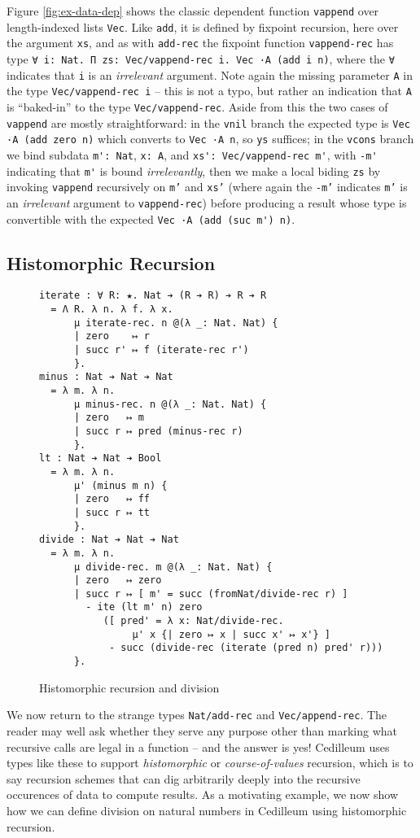 \documentclass{article}
\begin{document}
Figure \ref{fig:ex-data-dep} shows the classic dependent function
\texttt{vappend} over length-indexed lists \texttt{Vec}. Like \texttt{add}, it is
defined by fixpoint recursion, here over the argument \texttt{xs}, and as with
\texttt{add-rec} the fixpoint function \texttt{vappend-rec} has type
\verb;∀ i: Nat. Π zs: Vec/vappend-rec i. Vec ·A (add i n);, where the \texttt{∀}
indicates that \texttt{i} is an \textit{irrelevant} argument. Note again the
missing parameter \texttt{A} in the type \texttt{Vec/vappend-rec i} -- this is
not a typo, but rather an indication that \texttt{A} is ``baked-in'' to the type
\texttt{Vec/vappend-rec}. Aside from this the two cases of \texttt{vappend} are
mostly straightforward: in the \texttt{vnil} branch the expected type is
\verb;Vec ·A (add zero n); which converts to \verb;Vec ·A n;, so \texttt{ys}
suffices; in the \texttt{vcons} branch we bind subdata \verb;m': Nat;,
\verb;x: A;, and \verb;xs': Vec/vappend-rec m';, with \verb;-m'; indicating
that \verb;m'; is bound \textit{irrelevantly}, then we make a local biding
\texttt{zs} by invoking \verb;vappend; recursively on \texttt{m'} and
\texttt{xs'} (where again the \texttt{-m'} indicates \texttt{m'} is an
\textit{irrelevant} argument to \texttt{vappend-rec}) before producing a result whose type is
convertible with the expected \verb;Vec ·A (add (suc m') n);.

\subsection{Histomorphic Recursion}
\label{sec:hist-rec}
\begin{figure}[h]
\begin{verbatim}
iterate : ∀ R: ★. Nat ➔ (R ➔ R) ➔ R ➔ R
  = Λ R. λ n. λ f. λ x.
      μ iterate-rec. n @(λ _: Nat. Nat) {
      | zero    ↦ r
      | succ r' ↦ f (iterate-rec r') 
      }.
minus : Nat ➔ Nat ➔ Nat
  = λ m. λ n.
      μ minus-rec. n @(λ _: Nat. Nat) {
      | zero   ↦ m
      | succ r ↦ pred (minus-rec r)
      }.
lt : Nat ➔ Nat ➔ Bool
  = λ m. λ n.
      μ' (minus m n) {
      | zero   ↦ ff
      | succ r ↦ tt
      }.
divide : Nat ➔ Nat ➔ Nat
  = λ m. λ n.
      μ divide-rec. m @(λ _: Nat. Nat) {
      | zero   ↦ zero
      | succ r ↦ [ m' = succ (fromNat/divide-rec r) ]
        - ite (lt m' n) zero
           ([ pred' = λ x: Nat/divide-rec.
                μ' x {| zero ↦ x | succ x' ↦ x'} ]
            - succ (divide-rec (iterate (pred n) pred' r)))
      }.
\end{verbatim}
  \caption{Histomorphic recursion and division}
  \label{fig:ex-data-div}
\end{figure}
We now return to the strange types \verb;Nat/add-rec; and \verb;Vec/append-rec;.
The reader may well ask whether they serve any purpose other than marking what
recursive calls are legal in a function -- and the answer is yes! Cedilleum uses
types like these to support \textit{histomorphic} or \textit{course-of-values}
recursion, which is to say recursion schemes that can dig arbitrarily deeply
into the recursive occurences of data to compute results. As a motivating
example, we now show how we can define division on natural numbers in Cedilleum
using histomorphic recursion.
\end{document}
